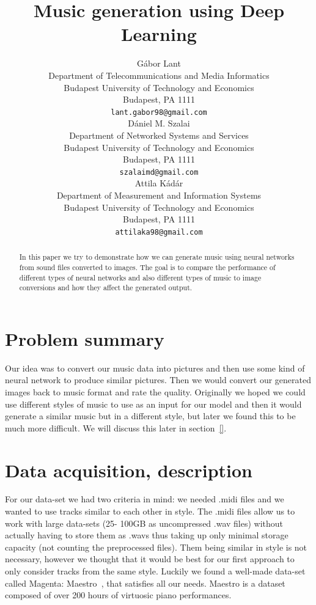 \documentclass{article}
\title{Music generation using Deep Learning}
\author{
	Gábor Lant \\
	Department of Telecommunications and Media Informatics\\
	Budapest University of Technology and Economics\\
	Budapest, PA 1111 \\
	\texttt{lant.gabor98@gmail.com} \\
	\And
	Dániel M. Szalai\\
	Department of Networked Systems and Services\\
	Budapest University of Technology and Economics\\
	Budapest, PA 1111\\
	\texttt{szalaimd@gmail.com}\\
	\And
	Attila Kádár\\
	Department of Measurement and Information Systems\\
	Budapest University of Technology and Economics\\
	Budapest, PA 1111\\
	\texttt{attilaka98@gmail.com}
}
\begin{document}

\maketitle

\begin{abstract}
  In this paper we try to demonstrate how we can generate music using neural networks from sound files converted to images. The goal is to compare the performance of different types of neural networks and also different types of music to image conversions and how they affect the generated output.
\end{abstract}

\section{Problem summary}
\label{sec:summary}
Our idea was to convert our music data into pictures and then use some kind of neural network to produce similar pictures. Then we would convert our generated images back to music format and rate the quality. Originally we hoped we could use different styles of music to use as an input for our model and then it would generate a similar music but in a different style, but later we found this to be much more difficult. We will discuss this later in section~\ref{}.

\section{Data acquisition, description}
\label{sec:data}
For our data-set we had two criteria in mind: we needed .midi files and we wanted to use tracks similar to each other in style. The .midi files allow us to work with large data-sets (25- 100GB as uncompressed .wav files) without actually having to store them as .wavs thus taking up only minimal storage capacity (not counting the preprocessed files). Them being similar in style is not necessary, however we thought that it would be best for our first approach to only consider tracks from the same style. Luckily we found a well-made data-set called Magenta: Maestro~\cite{maestro}, that satisfies all our needs. Maestro is a dataset composed of over 200 hours of virtuosic piano performances.
\end{document}
